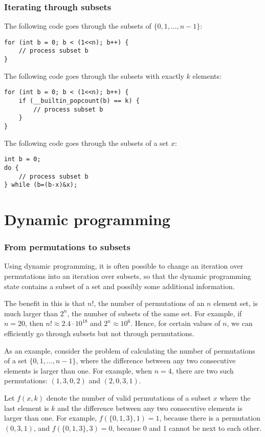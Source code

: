 \subsubsection{Iterating through subsets}

The following code goes through
the subsets of $\{0,1,\ldots,n-1\}$:

\begin{lstlisting}
for (int b = 0; b < (1<<n); b++) {
    // process subset b
}
\end{lstlisting}
The following code goes through
the subsets with exactly $k$ elements:
\begin{lstlisting}
for (int b = 0; b < (1<<n); b++) {
    if (__builtin_popcount(b) == k) {
        // process subset b
    }
}
\end{lstlisting}
The following code goes through the subsets
of a set $x$:
\begin{lstlisting}
int b = 0;
do {
    // process subset b
} while (b=(b-x)&x);
\end{lstlisting}

\section{Dynamic programming}

\subsubsection{From permutations to subsets}

Using dynamic programming, it is often possible
to change an iteration over permutations into
an iteration over subsets, so that
the dynamic programming state
contains a subset of a set and possibly
some additional information.

The benefit in this is that
$n!$, the number of permutations of an $n$ element set,
is much larger than $2^n$, the number of subsets
of the same set.
For example, if $n=20$, then
$n! \approx 2.4 \cdot 10^{18}$ and $2^n \approx 10^6$.
Hence, for certain values of $n$,
we can efficiently go through subsets but not through permutations.

As an example, consider the problem of
calculating the number of
permutations of a set $\{0,1,\ldots,n-1\}$,
where the difference between any two consecutive
elements is larger than one.
For example, when $n=4$, there are two such permutations:
$(1,3,0,2)$ and $(2,0,3,1)$.

Let $f(x,k)$ denote the number of valid permutations
of a subset $x$ where the last element is $k$ and
the difference between any two consecutive
elements is larger than one.
For example, $f(\{0,1,3\},1)=1$,
because there is a permutation $(0,3,1)$,
and $f(\{0,1,3\},3)=0$, because 0 and 1
cannot be next to each other.

